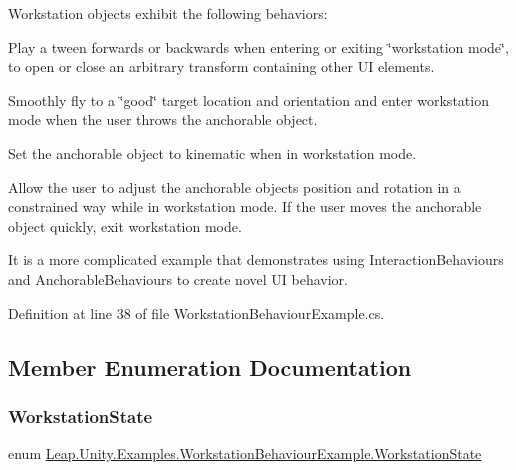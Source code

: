 Workstation objects exhibit the following behaviors\+:
\begin{DoxyItemize}
\item Play a tween forwards or backwards when entering or exiting \char`\"{}workstation mode\char`\"{}, to open or close an arbitrary transform containing other UI elements.
\item Smoothly fly to a \char`\"{}good\char`\"{} target location and orientation and enter workstation mode when the user throws the anchorable object.
\item Set the anchorable object to kinematic when in workstation mode.
\item Allow the user to adjust the anchorable object\textquotesingle{}s position and rotation in a constrained way while in workstation mode. If the user moves the anchorable object quickly, exit workstation mode.
\end{DoxyItemize}

It is a more complicated example that demonstrates using Interaction\+Behaviours and Anchorable\+Behaviours to create novel UI behavior. 

Definition at line 38 of file Workstation\+Behaviour\+Example.\+cs.



\subsection{Member Enumeration Documentation}
\mbox{\label{class_leap_1_1_unity_1_1_examples_1_1_workstation_behaviour_example_ae21c3ce4f1aac3e1920073e0e674cbcc}} 
\subsubsection{\texorpdfstring{WorkstationState}{WorkstationState}}
{\footnotesize\ttfamily enum \mbox{\hyperlink{class_leap_1_1_unity_1_1_examples_1_1_workstation_behaviour_example_ae21c3ce4f1aac3e1920073e0e674cbcc}{Leap.\+Unity.\+Examples.\+Workstation\+Behaviour\+Example.\+Workstation\+State}}\hspace{0.3cm}{\ttfamily [strong]}}

